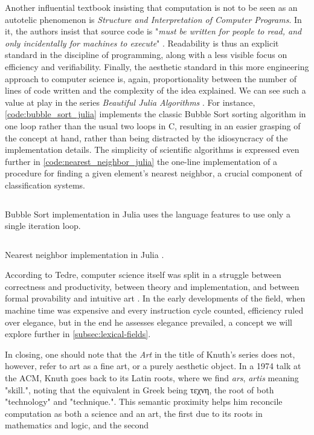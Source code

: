 Another influential textbook insisting that computation is not to be seen as an autotelic phenomenon is \emph{Structure and Interpretation of Computer Programs}. In it, the authors insist that source code is "\emph{must be written for people to read, and only incidentally for machines to execute}" \citep{abelson_structure_1979}. Readability is thus an explicit standard in the discipline of programming, along with a less visible focus on efficiency and verifiability. Finally, the aesthetic standard in this more engineering approach to computer science is, again, proportionality between the number of lines of code written and the complexity of the idea explained. We can see such a value at play in the series \emph{Beautiful Julia Algorithms} \citep{moss_beautifulalgorithms_2022}. For instance, \ref{code:bubble_sort_julia} implements the classic Bubble Sort sorting algorithm in one loop rather than the usual two loops in C, resulting in an easier grasping of the concept at hand, rather than being distracted by the idiosyncracy of the implementation details. The simplicity of scientific algorithms is expressed even further in \ref{code:nearest_neighbor_julia} the one-line implementation of a procedure for finding a given element's nearest neighbor, a crucial component of classification systems.

\begin{listing}
  \inputminted{julia}{./corpus/bubblesort.jl}
  \caption{Bubble Sort implementation in Julia uses the language features to use only a single iteration loop. \citep{moss_bubblesort_2021}}
  \label{code:bubble_sort_julia}
\end{listing}

\begin{listing}
  \inputminted{julia}{./corpus/nearest_neighbor.jl}
  \caption{Nearest neighbor implementation in Julia \citep{moss_nearestneighbors_2021}.}
  \label{code:nearest_neighbor_julia}
\end{listing}

According to Tedre, computer science itself was split in a struggle between correctness and productivity, between theory and implementation, and between formal provability and intuitive art \citep{tedre_science_2014}. In the early developments of the field, when machine time was expensive and every instruction cycle counted, efficiency ruled over elegance, but in the end he assesses elegance prevailed, a concept we will explore further in \ref{subsec:lexical-fields}.

In closing, one should note that the \emph{Art} in the title of Knuth's series does not, however, refer to art as a fine art, or a purely aesthetic object. In a 1974 talk at the ACM, Knuth goes back to its Latin roots, where we find \emph{ars}, \emph{artis} meaning "skill.", noting that the equivalent in Greek being τεχνη, the root of both "technology" and "technique.". This semantic proximity helps him reconcile computation as both a science and an art, the first due to its roots in mathematics and logic, and the second

